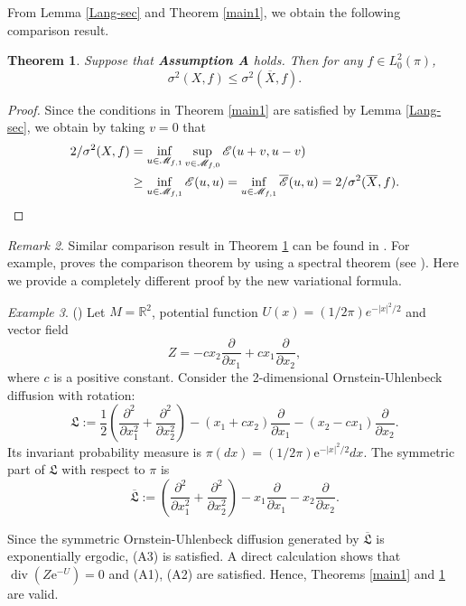 \documentclass[12pt,reqno]{article}
\newtheorem{thm}{Theorem}[section]
\theoremstyle{definition}
\theoremstyle{remark}
\newtheorem{rem}[thm]{Remark}
\theoremstyle{example}
\newtheorem{exm}[thm]{Example}
\numberwithin{equation}{section}
\newcommand{\scr}[1]{\mathscr #1}
\def\d{\mathrm{d}}
\def\e{\scr E}
\def\d{\rm d}
\def\lb{\label}
\def\bar{\overline}
\def\d{{\mbox{\rm d}}}
\begin{document}
{From Lemma \ref{Lang-sec} and Theorem \ref{main1}, we obtain the following comparison result.

\begin{thm}\lb{compr-diff}
Suppose that {\bf Assumption A} holds. Then for any $f\in L^2_0(\pi)$,
$$
\sigma^2(X,f)\leq \sigma^2(\bar{X},f).
$$
\end{thm}
\begin{proof}
Since the conditions in Theorem \ref{main1} are satisfied by Lemma \ref{Lang-sec}, %
we obtain by taking $v=0$ that
$$
\aligned
2/\sigma^2(X,f)&=\inf_{u\in\scr{M}_{f,1}}\sup_{v\in\scr{M}_{f,0}}\e(u+v,u-v)\\
&\geq \inf_{u\in\scr{M}_{f,1}}\e(u,u)=\inf_{u\in\scr{M}_{f,1}}\bar{\e}(u,u)=2/\sigma^2(\bar{X},f).
\endaligned
$$
\end{proof}

\begin{rem}
Similar comparison result in Theorem \ref{compr-diff} can be found in \cite{DLP16,HNW15}. For example, \cite{HNW15} proves the comparison theorem by using a spectral theorem (see \cite[Section 3.4.3]{HNW15}). Here we provide a completely different proof by the new variational formula.
\end{rem}



\begin{exm}(\cite[Example 5.2]{KS14})
	Let $M=\mathbb{R}^{2}$, potential function $U(x)=(1 / 2 \pi) e^{-|x|^{2} / 2}$ and vector field
	$$
	Z=-c x_{2} \frac{\partial}{\partial x_{1}}+c x_{1} \frac{\partial}{\partial x_{2}},
	$$ where $c$ is a positive constant. Consider the 2-dimensional Ornstein-Uhlenbeck diffusion with rotation:
	$$
	\mathfrak{L}:=\frac{1}{2}\left(\frac{\partial^{2}}{\partial x_{1}^{2}}+\frac{\partial^{2}}{\partial x_{2}^{2}}\right)-(x_{1}+c x_{2}) \frac{\partial}{\partial x_{1}}-(x_{2}-cx_1) \frac{\partial}{\partial x_{2}}.
	$$
	 Its invariant probability measure is $\pi(d x)=(1 / 2 \pi) \mathrm{e}^{-|x|^{2} / 2} d x$. The symmetric part of $\mathfrak{L}$ with respect to $\pi$ is
	$$\bar{\mathfrak{L}}:=\left(\frac{\partial^{2}}{\partial x_{1}^{2}}+\frac{\partial^{2}}{\partial x_{2}^{2}}\right)-x_{1} \frac{\partial}{\partial x_{1}}-x_{2} \frac{\partial}{\partial x_{2}}. $$%

	Since the symmetric Ornstein-Uhlenbeck diffusion generated by $\bar{\mathfrak{L}}$ is exponentially ergodic, (A3) is satisfied.  A direct calculation shows that $ \operatorname{div}( Z\mathrm{e}^{-U})=0$ and (A1), (A2) are satisfied. Hence,  Theorems \ref{main1} and \ref{compr-diff} are valid.  %
\end{exm}	





}
\end{document}
